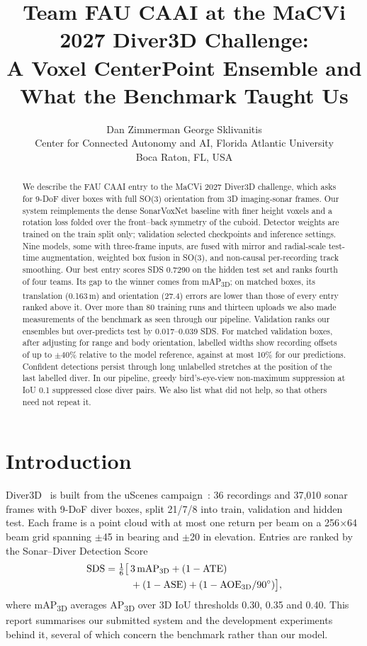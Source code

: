 \documentclass[10pt,twocolumn,letterpaper]{article}
\title{Team FAU CAAI at the MaCVi 2027 Diver3D Challenge:\\A Voxel CenterPoint Ensemble and What the Benchmark Taught Us}
\author{Dan Zimmerman \qquad George Sklivanitis\\
Center for Connected Autonomy and AI, Florida Atlantic University\\
Boca Raton, FL, USA}
\newcommand{\sds}{\mbox{SDS}}
\newcommand{\aoe}{\mbox{AOE\textsubscript{3D}}}
\begin{document}
\maketitle

\begin{abstract}
We describe the FAU CAAI entry to the MaCVi 2027 Diver3D challenge, which asks for 9-DoF diver boxes with full SO(3) orientation from 3D imaging-sonar frames.
Our system reimplements the dense SonarVoxNet baseline with finer height voxels and a rotation loss folded over the front--back symmetry of the cuboid.
Detector weights are trained on the train split only; validation selected checkpoints and inference settings.
Nine models, some with three-frame inputs, are fused with mirror and radial-scale test-time augmentation, weighted box fusion in SO(3), and non-causal per-recording track smoothing.
Our best entry scores \sds{} 0.7290 on the hidden test set and ranks fourth of four teams.
Its gap to the winner comes from mAP\textsubscript{3D}; on matched boxes, its translation (0.163\,m) and orientation (27.4\textdegree) errors are lower than those of every entry ranked above it.
Over more than 80 training runs and thirteen uploads we also made measurements of the benchmark as seen through our pipeline.
Validation ranks our ensembles but over-predicts test by 0.017--0.039 \sds{}.
For matched validation boxes, after adjusting for range and body orientation, labelled widths show recording offsets of up to $\pm$40\% relative to the model reference, against at most 10\% for our predictions.
Confident detections persist through long unlabelled stretches at the position of the last labelled diver.
In our pipeline, greedy bird's-eye-view non-maximum suppression at IoU 0.1 suppressed close diver pairs.
We also list what did not help, so that others need not repeat it.
\end{abstract}

\section{Introduction}
Diver3D~\cite{sonarvoxnet2026} is built from the uScenes campaign~\cite{uscenes2026}: 36 recordings and 37{,}010 sonar frames with 9-DoF diver boxes, split 21/7/8 into train, validation and hidden test.
Each frame is a point cloud with at most one return per beam on a 256$\times$64 beam grid spanning $\pm$45\textdegree{} in bearing and $\pm$20\textdegree{} in elevation.
Entries are ranked by the Sonar--Diver Detection Score
\begin{equation}
\begin{split}
\sds = \tfrac{1}{6}\big[\,&3\,\mathrm{mAP_{3D}} + (1-\mathrm{ATE})\\
&+ (1-\mathrm{ASE}) + (1-\aoe/90^\circ)\big],
\end{split}
\end{equation}
where mAP\textsubscript{3D} averages AP\textsubscript{3D} over 3D IoU thresholds 0.30, 0.35 and 0.40.
This report summarises our submitted system and the development experiments behind it, several of which concern the benchmark rather than our model.
\end{document}
